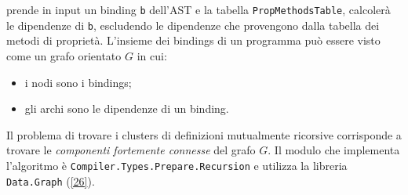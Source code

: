 \documentclass[10pt,a4paper]{article}
\begin{document}
prende in input un binding \texttt{b} dell'AST e la tabella \texttt{PropMethodsTable}, calcolerà le dipendenze di
\texttt{b}, escludendo le dipendenze che provengono dalla tabella dei metodi di proprietà. L'insieme dei bindings di
un programma può essere visto come un grafo orientato $ G $ in cui:
\begin{itemize}
    \item i nodi sono i bindings;
    \item gli archi sono le dipendenze di un binding.
\end{itemize}
Il problema di trovare i clusters di definizioni mutualmente ricorsive corrisponde a trovare le \textit{componenti
fortemente connesse} del grafo $ G $. Il modulo che implementa l'algoritmo è \texttt{Compiler.Types.Prepare.Recursion}
e utilizza la libreria \texttt{Data.Graph} (\hyperlink{bibl26}{[26]}).
\end{document}
